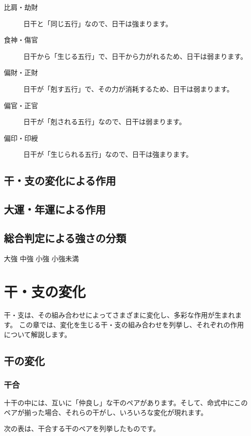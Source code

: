 \documentclass[a5paper,11pt,dvipdfmx]{tarticle}
\begin{document}
\begin{description}
\item[比肩・劫財] 日干と「同じ五行」なので、日干は強まります。
\item[食神・傷官] 日干から「生じる五行」で、日干から力がれるため、日干は弱まります。
\item[偏財・正財] 日干が「剋す五行」で、その力が消耗するため、日干は弱まります。
\item[偏官・正官] 日干が「剋される五行」なので、日干は弱まります。
\item[偏印・印綬] 日干が「生じられる五行」なので、日干は強まります。
\end{description}


\subsection{干・支の変化による作用}


\subsection{大運・年運による作用}


\subsection{総合判定による強さの分類}

大強
中強
小強
小強未満

\clearpage

\section{干・支の変化}

干・支は、その組み合わせによってさまざまに変化し、多彩な作用が生まれます。
この章では、変化を生じる干・支の組み合わせを列挙し、それぞれの作用について解説します。

\subsection{干の変化}

\subsubsection*{干合}
十干の中には、互いに「仲良し」な干のペアがあります。そして、命式中にこのペアが揃った場合、それらの干がし、いろいろな変化が現れます。

次の表は、干合する干のペアを列挙したものです。
\end{document}
